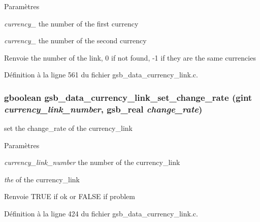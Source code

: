 \begin{DoxyParams}{Paramètres}
\item[{\em currency\_\-1}]the number of the first currency \item[{\em currency\_\-2}]the number of the second currency\end{DoxyParams}
\begin{DoxyReturn}{Renvoie}
the number of the link, 0 if not found, -\/1 if they are the same currencies 
\end{DoxyReturn}


Définition à la ligne 561 du fichier gsb\_\-data\_\-currency\_\-link.c.

\subsubsection[{gsb\_\-data\_\-currency\_\-link\_\-set\_\-change\_\-rate}]{\setlength{\rightskip}{0pt plus 5cm}gboolean gsb\_\-data\_\-currency\_\-link\_\-set\_\-change\_\-rate (gint {\em currency\_\-link\_\-number}, \/  {\bf gsb\_\-real} {\em change\_\-rate})}\label{gsb__data__currency__link_8c_a8d185945246d4c709ddafcf1daecfa38}
set the change\_\-rate of the currency\_\-link


\begin{DoxyParams}{Paramètres}
\item[{\em currency\_\-link\_\-number}]the number of the currency\_\-link \item[{\em the}]of the currency\_\-link\end{DoxyParams}
\begin{DoxyReturn}{Renvoie}
TRUE if ok or FALSE if problem 
\end{DoxyReturn}


Définition à la ligne 424 du fichier gsb\_\-data\_\-currency\_\-link.c.


